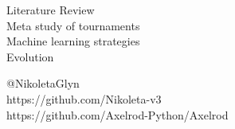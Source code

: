\documentclass{beamer}
\begin{document}
\begin{frame}
\begin{center}
    \Large{Literature Review} \\
    \Large{Meta study of tournaments} \\
    \Large{Machine learning strategies} \\
    \Large{Evolution}
\end{center}
\end{frame}
\begin{frame}
	\begin{center}
		\small{@NikoletaGlyn}\\
		\small{https://github.com/Nikoleta-v3}\\
		\small{https://github.com/Axelrod-Python/Axelrod}
	\end{center}
\end{frame}
\end{document}
